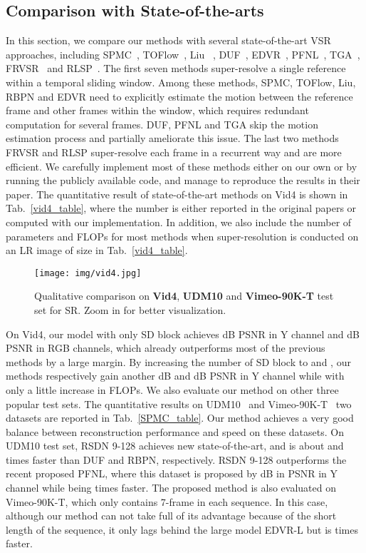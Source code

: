 \subsection{Comparison with State-of-the-arts}
In this section, we compare our methods with several state-of-the-art VSR approaches, including SPMC~\cite{tao2017detail}, TOFlow~\cite{xue2019video}, Liu ~\cite{liu2017robust}, DUF~\cite{haris2019recurrent}, EDVR~\cite{wang2019edvr}, PFNL~\cite{yi2019progressive}, TGA~\cite{isobe2020video}, FRVSR~\cite{sajjadi2018frame} and RLSP~\cite{Fuoli-arxiv19-rlsp}. The first seven methods super-resolve a single reference within a temporal sliding window. Among these methods, SPMC, TOFlow, Liu, RBPN and EDVR need to explicitly estimate the motion between the reference frame and other frames within the window, which requires redundant computation for several frames. DUF, PFNL and TGA skip the motion estimation process and partially ameliorate this issue. The last two methods FRVSR and RLSP super-resolve each frame in a recurrent way and are more efficient. 
We carefully implement most of these methods either on our own or by running the publicly available code, and manage to reproduce the results in their paper. 
The quantitative result of state-of-the-art methods on Vid4 is shown in Tab.~\ref{vid4_table}, where the number is either reported in the original papers or computed with our implementation. 
In addition, we also include the number of parameters and FLOPs for most methods when super-resolution is conducted on an LR image of size  in Tab.~\ref{vid4_table}. 

\begin{figure}[t]
	\centering
	\texttt{[image: img/vid4.jpg]}
	\caption{Qualitative comparison on \textbf{Vid4}, \textbf{UDM10} and \textbf{Vimeo-90K-T} test set for  SR. Zoom in for better visualization.}
	\label{fig:qualitative}
 	\vspace{-3mm}
\end{figure}
On Vid4, our model with only  SD block achieves dB PSNR in Y channel and dB PSNR in RGB channels, which already outperforms most of the previous methods by a large margin. By increasing the number of SD block to  and , our methods respectively gain another dB and dB PSNR in Y channel while with only a little increase in FLOPs. 
We also evaluate our method on other three popular test sets. The quantitative results on UDM10~\cite{yi2019progressive} and Vimeo-90K-T~\cite{xue2019video} two datasets are reported in Tab.~\ref{SPMC_table}. 
Our method achieves a very good balance between reconstruction performance and speed on these datasets.
On UDM10 test set, RSDN 9-128 achieves new state-of-the-art, and is about  and  times faster than DUF and RBPN, respectively. RSDN 9-128 outperforms the recent proposed PFNL, where this dataset is proposed by dB in PSNR in Y channel while being  times faster. 
The proposed method is also evaluated on Vimeo-90K-T, which only contains 7-frame in each sequence. In this case, although our method can not take full of its advantage because of the short length of the sequence, it only lags behind the large model EDVR-L but is  times faster.


